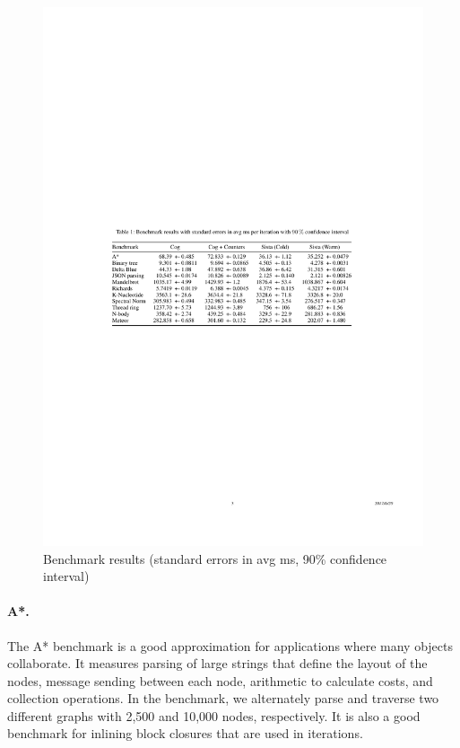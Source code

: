\documentclass[a4paper,12pt,twoside]{../includes/ThesisStyle}
\begin{document}
\begin{figure}[h!]
    \begin{center}
        \includegraphics[width=0.95\linewidth]{BenchTable}
        \caption{Benchmark results (standard errors in avg ms, 90\% confidence interval)}
        \label{tbl:benchmark}
	\end{center}
\end{figure}

	\paragraph{A*.}The A* benchmark is a good approximation for applications where many objects collaborate. It measures parsing of large strings that define the layout of the nodes, message sending between each node, arithmetic to calculate costs, and collection operations. In the benchmark, we alternately parse and traverse two different graphs with 2,500 and 10,000 nodes, respectively. It is also a good benchmark for inlining block closures that are used in iterations.
\end{document}
